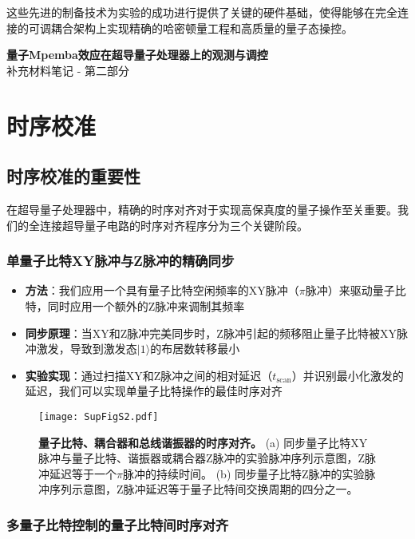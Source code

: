 \documentclass[11pt,a4paper]{article}
\begin{document}
这些先进的制备技术为实验的成功进行提供了关键的硬件基础，使得能够在完全连接的可调耦合架构上实现精确的哈密顿量工程和高质量的量子态操控。


\clearpage
\begin{center}
    {\LARGE \textbf{量子Mpemba效应在超导量子处理器上的观测与调控}} \\[6pt]
    {\large 补充材料笔记 - 第二部分}
\end{center}

\section{时序校准}

\subsection{时序校准的重要性}

在超导量子处理器中，精确的时序对齐对于实现高保真度的量子操作至关重要。我们的全连接超导量子电路的时序对齐程序分为三个关键阶段。

\subsubsection{单量子比特XY脉冲与Z脉冲的精确同步}

\begin{itemize}
    \item \textbf{方法}：我们应用一个具有量子比特空闲频率的XY脉冲（$\pi$脉冲）来驱动量子比特，同时应用一个额外的Z脉冲来调制其频率
    \item \textbf{同步原理}：当XY和Z脉冲完美同步时，Z脉冲引起的频移阻止量子比特被XY脉冲激发，导致到激发态$|1\rangle$的布居数转移最小
    \item \textbf{实验实现}：通过扫描XY和Z脉冲之间的相对延迟（$t_{\text{scan}}$）并识别最小化激发的延迟，我们可以实现单量子比特操作的最佳时序对齐
\end{itemize}

\begin{figure}[H]
    \centering
    \texttt{[image: SupFigS2.pdf]}
    \caption{
        \textbf{量子比特、耦合器和总线谐振器的时序对齐。}
        (a) 同步量子比特XY脉冲与量子比特、谐振器或耦合器Z脉冲的实验脉冲序列示意图，Z脉冲延迟等于一个$\pi$脉冲的持续时间。
        (b) 同步量子比特Z脉冲的实验脉冲序列示意图，Z脉冲延迟等于量子比特间交换周期的四分之一。
    }
    \label{fig:timing_alignment}
\end{figure}

\subsubsection{多量子比特控制的量子比特间时序对齐}
\end{document}
